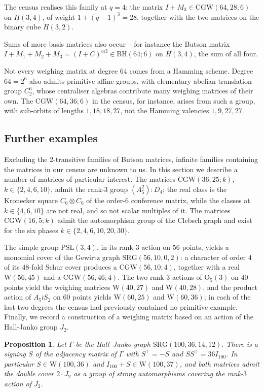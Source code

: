 \documentclass{article}
\newtheorem{proposition}[theorem]{Proposition}
\theoremstyle{definition}
\theoremstyle{remark}
\newcommand{\CGW}{\mathrm{CGW}}
\newcommand{\BH}{\mathrm{BH}}
\newcommand{\We}{\mathrm{W}}
\begin{document}
The census realises this family at $q=4$: the matrix $I+M_3\in\CGW(64,28;6)$ on
$H(3,4)$, of weight $1+(q-1)^3=28$, together with the two matrices on the binary
cube $H(3,2)$.

Sums of more basis matrices also occur -- for instance the Butson matrix
$I+M_1+M_2+M_3=(I+C)^{\otimes3}\in\BH(64;6)$ on $H(3,4)$, the sum of all four.

Not every weighing matrix at degree $64$ comes from a Hamming scheme.  Degree
$64=2^6$ also admits primitive affine groups, with elementary abelian translation
group $C_2^6$, whose centraliser algebras contribute many weighing matrices of
their own.  The $\CGW(64,36;6)$ in the census, for instance, arises from such a
group, with sub-orbits of lengths $1,18,18,27$, not the Hamming valencies
$1,9,27,27$.

\subsection{Further examples}\label{sec:further}

Excluding the 2-transitive families of Butson matrices, infinite families containing the matrices in our census are unknown to us. In this section we describe a number of matrices of particular interest. The matrices $\CGW(36,25;k)$,
$k \in \{2,4,6,10\}$, admit the rank-$3$ group $(A_5^2){:}D_4$; the real
class is the Kronecker square $C_6 \otimes C_6$ of the order-$6$ conference
matrix, while the classes at $k \in \{4,6,10\}$ are not real, and so not
scalar multiples of it.  The matrices $\CGW(16,5;k)$ admit the
automorphism group of the Clebsch graph and exist for the six phases
$k \in \{2,4,6,10,20,30\}$.

The simple group $\mathrm{PSL}(3,4)$, in its rank-$3$
action on $56$ points, yields a monomial cover of the Gewirtz graph
$\mathrm{SRG}(56,10,0,2)$: a character of order $4$ of its $48$-fold
Schur cover produces a $\CGW(56,10;4)$, together with
a real $\We(56,45)$ and a $\CGW(56,46;4)$. The two rank-$3$ actions of
$\mathrm{O}_5(3)$ on $40$ points yield the weighing matrices
$\We(40,27)$ and $\We(40,28)$, and the product action of $A_5 \wr S_2$
on $60$ points yields $\We(60,25)$ and $\We(60,36)$; in each of the
last two degrees the census had previously contained no primitive
example. Finally, we record a construction of a weighing matrix based on 
an action of the Hall-Janko group $J_2$. 

\begin{proposition}\label{prop:hj}
Let $\Gamma$ be the Hall--Janko graph $\mathrm{SRG}(100,36,14,12)$.  There
is a signing $S$ of the adjacency matrix of $\Gamma$ with $S^{\top} = -S$
and $SS^{\top} = 36 I_{100}$.  In particular $S \in \We(100,36)$ and
$I_{100} + S \in \We(100,37)$, and both matrices admit the double cover
$2{\cdot}J_2$ as a group of strong automorphisms covering the rank-$3$
action of $J_2$.
\end{proposition}
\end{document}
